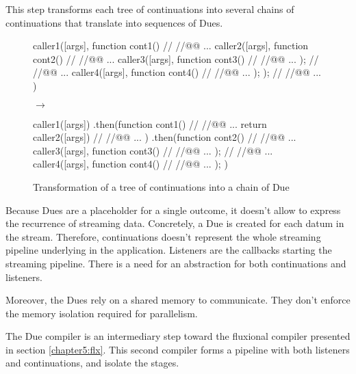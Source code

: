 This step transforms each tree of continuations into several chains of continuations that translate into sequences of Dues.

\begin{figure}[h!]
  \begin{minipage}{0.42\textwidth}
    \centering
    \begin{code}[js, caption={Nested calls of continuations},label={lst:nest-cint}]%
caller1([args], function cont1(){
  // //@@ ...
  caller2([args], function cont2(){
    // //@@ ...
    caller3([args], function cont3(){
      // //@@ ...
    });
    // //@@ ...
    caller4([args], function cont4(){
      // //@@ ...
    });
  });
  // //@@ ...
})\end{code}
  \end{minipage}
  \hfill
  $\to$
  \hfill
  \begin{minipage}{0.42\textwidth}
    \centering
    \begin{code}[js, caption={Chain of Due},label={lst:nest-cint}]%
caller1([args])
.then(function cont1(){
  // //@@ ...
  return caller2([args])
  // //@@ ...
})
.then(function cont2(){
  // //@@ ...
  caller3([args], function cont3(){
    // //@@ ...
  });
  // //@@ ...
  caller4([args], function cont4(){
    // //@@ ...
  });
})\end{code}
  \end{minipage}
  \caption{Transformation of a tree of continuations into a chain of Due}
  \label{fig:tree-to-chain}
\end{figure}


\separator


Because Dues are a placeholder for a single outcome, it doesn't allow to express the recurrence of streaming data.
Concretely, %
a Due is created for each datum in the stream.
Therefore, continuations doesn't represent the whole streaming pipeline underlying in the application.
Listeners are the callbacks starting the streaming pipeline.
There is a need for an abstraction for both continuations and listeners.

Moreover, the Dues rely on a shared memory to communicate.
They don't enforce the memory isolation required for parallelism.

The Due compiler is an intermediary step toward the fluxional compiler presented in section \ref{chapter5:flx}.
This second compiler forms a pipeline with both listeners and continuations, and isolate the stages.
